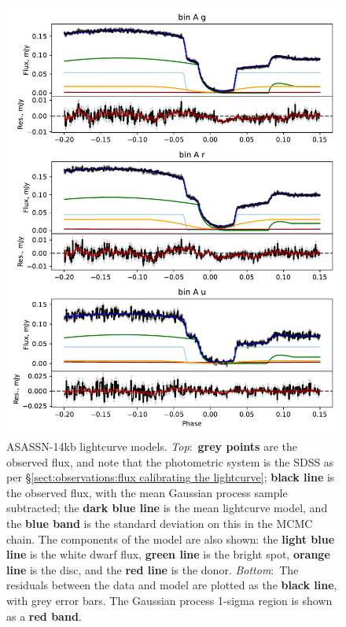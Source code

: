 \begin{figure}
    \centering
    \includegraphics[width=\textwidth]{figures/results/ASASSN-14kb/ASASSN-14kb_ex_1.pdf}
    \caption{ASASSN-14kb lightcurve models. {\it Top}:~{\bf grey points} are the observed flux, and note that the photometric system is the SDSS as per \S\ref{sect:observations:flux calibrating the lightcurve}; {\bf black line} is the observed flux, with the mean Gaussian process sample subtracted; the {\bf dark blue line} is the mean lightcurve model, and the {\bf blue band} is the standard deviation on this in the MCMC chain. The components of the model are also shown: the {\bf light blue line} is the white dwarf flux, {\bf green line} is the bright spot, {\bf orange line} is the disc, and the {\bf red line} is the donor. {\it Bottom}:~The residuals between the data and model are plotted as the {\bf black line}, with grey error bars. The Gaussian process 1-sigma region is shown as a {\bf red band}.}
    \label{fig:results:12 new CVs:ASASSN-14kb all lightcurves}
\end{figure}
